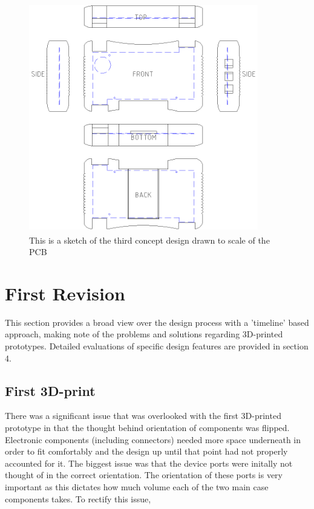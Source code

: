\begin{figure}[hbt!]
\centering
\includegraphics[width=10cm,height=10cm,keepaspectratio]{Figures/design3_sketch.png}
\caption{This is a sketch of the third concept design drawn to scale of the PCB}
\label{fig:Design_3}
\end{figure}


\section{First Revision}
This section provides a broad view over the design process with a 'timeline' based approach, making note of the problems and solutions regarding 3D-printed prototypes.
Detailed evaluations of specific design features are provided in section 4.

\subsection{First 3D-print}

There was a significant issue that was overlooked with the first 3D-printed prototype in that the thought behind orientation of components was flipped.
Electronic components (including connectors) needed more space underneath in order to fit comfortably and the design up until that point had not properly accounted for it.
The biggest issue was that the device ports were initally not thought of in the correct orientation.
The orientation of these ports is very important as this dictates how much volume each of the two main case components takes.
To rectify this issue, %

